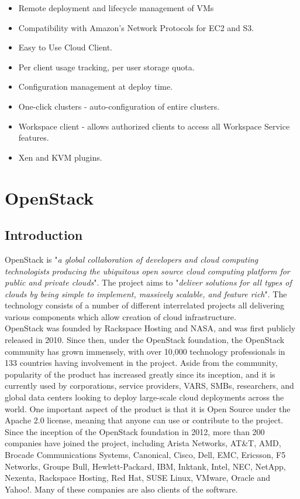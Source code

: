 \begin{itemize}
\itemsep0em
\item Remote deployment and lifecycle management of VMs
\item Compatibility with Amazon's Network Protocols for EC2 and S3.
\item Easy to Use Cloud Client.
\item Per client usage tracking, per user storage quota. 
\item Configuration management at deploy time. 
\item One-click clusters - auto-configuration of entire clusters.
\item Workspace client - allows authorized clients to access all Workspace Service features. 
\item Xen and KVM plugins. 

\end{itemize}

\section{OpenStack}
\subsection{Introduction}
OpenStack is "\textit{a global collaboration of developers and cloud computing technologists producing the ubiquitous open source cloud computing platform for public and private clouds}"\cite{openstackhomepage}. The project aims to "\textit{deliver solutions for all types of clouds by being simple to implement, massively scalable, and feature rich}\cite{openstackhomepage}". The technology consists of a number of different interrelated projects all delivering various components which allow creation of cloud infrastructure. \\ 
OpenStack was founded by Rackspace Hosting and NASA, and was first publicly released in 2010. Since then, under the OpenStack foundation, the OpenStack community has grown immensely, with over 10,000 technology professionals in 133 countries having involvement in the project. Aside from the community, popularity of the product has increased greatly since its inception, and it is currently used by corporations, service providers, VARS, SMBs, researchers, and global data centers looking to deploy large-scale cloud deployments across the world. One important aspect of the product is that it is Open Source under the Apache 2.0 license, meaning that anyone can use or contribute to the project.  
Since the inception of the OpenStack foundation in 2012, more than 200 companies have joined the project, including Arista Networks, AT\&T, AMD, Brocade Communications Systems, Canonical, Cisco, Dell, EMC, Ericsson, F5 Networks, Groupe Bull, Hewlett-Packard, IBM, Inktank, Intel, NEC, NetApp, Nexenta, Rackspace Hosting, Red Hat, SUSE Linux, VMware, Oracle and Yahoo!\cite{openstackcompanies}. Many of these companies are also clients of the software. 

